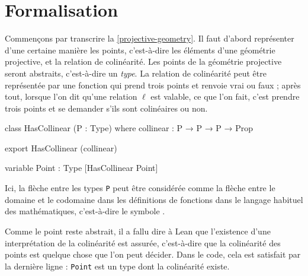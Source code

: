 \documentclass[12pt, oneside]{memoir}
\theoremstyle{definition}
\theoremstyle{remark}
\begin{document}
\chapter{Formalisation}
Commençons par transcrire la \cref{projective-geometry}. Il faut
d'abord représenter d'une certaine manière les points, c'est-à-dire
les éléments d'une géométrie projective, et la relation de
colinéarité. Les points de la géométrie projective seront abstraits,
c'est-à-dire un \textit{type}. La relation de colinéarité peut être
représentée par une fonction qui prend trois points et renvoie vrai ou
faux ; après tout, lorsque l'on dit qu'une relation $\ell$ est
valable, ce que l'on fait, c'est prendre trois points et se demander
s'ils sont colinéaires ou non.
\begin{leancode}
  class HasCollinear (P : Type) where
  collinear : P → P → P → Prop

  export HasCollinear (collinear)

  variable {Point : Type} [HasCollinear Point]
\end{leancode}
Ici, la flèche entre les types \texttt{P} peut être considérée comme
la flèche entre le domaine et le codomaine dans les définitions de
fonctions dans le langage habituel des mathématiques, c'est-à-dire le
symbole \say{$\to$}.

Comme le point reste abstrait, il a fallu dire à Lean que l'existence
d'une interprétation de la colinéarité est assurée, c'est-à-dire que
la colinéarité des points est quelque chose que l'on peut décider.
Dans le code, cela est satisfait par la dernière ligne :
\texttt{Point} est un type dont la colinéarité existe.
\end{document}

